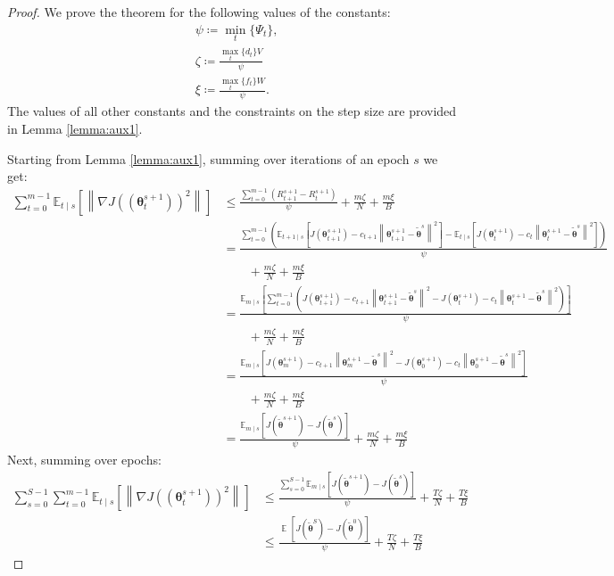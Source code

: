 \documentclass{article}
\theoremstyle{remark}
\theoremstyle{definition}
\DeclareMathOperator*{\EV}{\mathbb{E}}
\newcommand{\EVV}[2][\ppvect \in \ppspace]{\EV_{#1}\left[{#2}\right]}
\newcommand{\norm}[2][\infty]{\left\|#2\right\|_{#1}}
\newcommand{\vtheta}{\boldsymbol{\theta}}
\newcommand{\gradJ}[1]{\nabla J(#1)}
\newcommand{\Ets}[2][t]{\mathbb{E}_{#1\mid s}\left[#2\right]}
\begin{document}
\convergence*
\begin{proof}
We prove the theorem for the following values of the constants:
\begin{align*}
& \psi \coloneqq \min_t\{\Psi_t\}, \\
& \zeta \coloneqq \frac{\max_t\{d_t\}V}{\psi} \\
& \xi \coloneqq \frac{\max_t\{f_t\}W}{\psi}.
\end{align*}
The values of all other constants and the constraints on the step size are provided in Lemma \ref{lemma:aux1}.

Starting from Lemma \ref{lemma:aux1}, summing over iterations of an epoch $s$ we get:
\begin{align}
\sum_{t=0}^{m-1}\Ets{\norm[]{\gradJ{(\vtheta_t^{s+1})}^2}}&\leq
 \frac{\sum_{t=0}^{m-1}\left(R_{t+1}^{s+1} - R_t^{s+1}\right)}{\psi} + \frac{m\zeta}{N} + \frac{m\xi}{B} \\
 &= \frac{\sum_{t=0}^{m-1}\left(\Ets[t+1]{J(\vtheta_{t+1}^{s+1}) - c_{t+1}\norm[]{\vtheta_{t+1}^{s+1}-\tilde{\vtheta}^s}^2} - \Ets[t]{J(\vtheta_{t}^{s+1}) - c_{t}\norm[]{\vtheta_{t}^{s+1}-\tilde{\vtheta}^s}^2}\right)}{\psi} \nonumber\\
 &\qquad+ \frac{m\zeta}{N} + \frac{m\xi}{B} \\
 &= \frac{\Ets[m]{\sum_{t=0}^{m-1}\left(J(\vtheta_{t+1}^{s+1}) - c_{t+1}\norm[]{\vtheta_{t+1}^{s+1}-\tilde{\vtheta}^s}^2 - J(\vtheta_{t}^{s+1}) - c_{t}\norm[]{\vtheta_{t}^{s+1}-\tilde{\vtheta}^s}^2\right)}}{\psi} \nonumber\\
 &\qquad+ \frac{m\zeta}{N} + \frac{m\xi}{B} \\
 &= \frac{\Ets[m]{J(\vtheta_{m}^{s+1}) - c_{t+1}\norm[]{\vtheta_{m}^{s+1}-\tilde{\vtheta}^s}^2 - J(\vtheta_{0}^{s+1}) - c_{t}\norm[]{\vtheta_{0}^{s+1}-\tilde{\vtheta}^s}^2}}{\psi} \nonumber\\
 &\qquad+ \frac{m\zeta}{N} + \frac{m\xi}{B} \\
 &= \frac{\Ets[m]{J(\tilde{\vtheta}^{s+1}) - J(\tilde{\vtheta}^{s})}}{\psi} + \frac{m\zeta}{N} + \frac{m\xi}{B}
 \end{align}
Next, summing over epochs:
\begin{align}
\sum_{s=0}^{S-1}\sum_{t=0}^{m-1}\Ets{\norm[]{\gradJ{(\vtheta_t^{s+1})}^2}}&\leq
\frac{\sum_{s=0}^{S-1}\Ets[m]{J(\tilde{\vtheta}^{s+1}) - J(\tilde{\vtheta}^{s})}}{\psi} + \frac{T\zeta}{N} + \frac{T\xi}{B} \\
%
&\leq
\frac{\EVV[]{J(\tilde{\vtheta}^{S}) - J(\tilde{\vtheta}^{0})}}{\psi} + \frac{T\zeta}{N} + \frac{T\xi}{B}

\end{align}
\end{proof}
\end{document}
